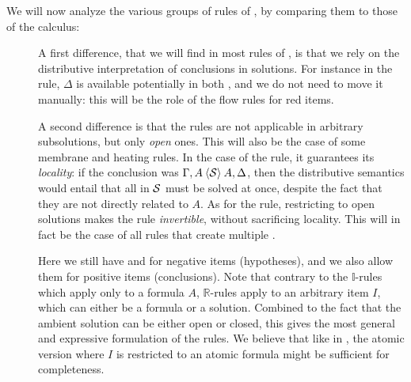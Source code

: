 We will now analyze the various groups of rules of , by
comparing them to those of the  calculus:
\begin{description}
  \item[\textbf{\identity}] 
  A first difference, that we will find in most rules of , is that
  we rely on the distributive interpretation of conclusions in solutions. For
  instance in the  rule, $\Delta$ is available potentially in
  both , and we do not need to move it manually: this will be the role
  of the flow rules for red items.
  
  A second difference is that the rules are not applicable in arbitrary
  subsolutions, but only \emph{open} ones. This will also be the case of some
  membrane and heating rules. In the case of the  rule, it
  guarantees its \emph{locality}: if the conclusion was $\Gamma, A \mathbin{\langle \mathcal{S} \rangle} A,
  \Delta$, then the distributive semantics would entail that all  in
  $\mathcal{S}$ must be solved at once, despite the fact that they are not directly
  related to $A$. As for the
   rule, restricting to open solutions makes the rule
  \emph{invertible}, without sacrificing locality. This will in fact be the case
  of all rules that create multiple .

  \item[\textbf{\resource}] 
  Here we still have  and  for negative items (hypotheses),
  and we also allow them for positive items (conclusions). Note that contrary to
  the $\mathbb{I}$-rules which apply only to a formula $A$, $\mathbb{R}$-rules
  apply to an arbitrary item $I$, which can either be a formula or a solution.
  Combined to the fact that the ambient solution can be either open or closed,
  this gives the most general and expressive formulation of the rules. We
  believe that like in , the atomic version where $I$ is restricted to an
  atomic formula might be sufficient for completeness.

  \item[\textbf{\flow}]


\end{description}
